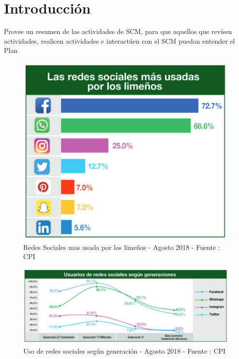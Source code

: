\chapter{Introducci\'on}
\label{intro}


Provee un resumen de las actividades de SCM, para que aquellos que revisen actividades, 
realicen actividades e interactúen con el SCM puedan entender el Plan

\begin{figure}
\centering
\includegraphics[scale=0.7]{chapters/img/Ch01_UsoRedesSocialesLima.PNG}
\caption{Redes Sociales mas usada por los lime\~nos - Agosto 2018 - Fuente : CPI}
\end{figure}


\begin{figure}
\centering
\includegraphics[scale=0.5]{chapters/img/Ch01_UsoRedesSocialesGeneracion.PNG}
\caption{Uso de redes sociales seg\'un generaci\'on - Agosto 2018 - Fuente : CPI}
\end{figure}


\cleardoublepage